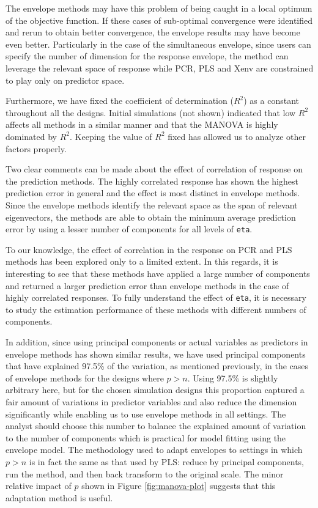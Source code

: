 \documentclass[review]{elsarticle}
\begin{document}
The envelope methods may have this problem of being caught in a local optimum of the objective function. If these cases of sub-optimal convergence were identified and rerun to obtain better convergence, the envelope results may have become even better. Particularly in the case of the simultaneous envelope, since users can specify the number of dimension for the response envelope, the method can leverage the relevant space of response while PCR, PLS and Xenv are constrained to play only on predictor space.

Furthermore, we have fixed the coefficient of determination (\(R^2\)) as a constant throughout all the designs. Initial simulations (not shown) indicated that low \(R^2\) affects all methods in a similar manner and that the MANOVA is highly dominated by \(R^2\). Keeping the value of \(R^2\) fixed has allowed us to analyze other factors properly.

Two clear comments can be made about the effect of correlation of response on the prediction methods. The highly correlated response has shown the highest prediction error in general and the effect is most distinct in envelope methods. Since the envelope methods identify the relevant space as the span of relevant eigenvectors, the methods are able to obtain the minimum average prediction error by using a lesser number of components for all levels of \texttt{eta}.

To our knowledge, the effect of correlation in the response on PCR and PLS methods has been explored only to a limited extent. In this regards, it is interesting to see that these methods have applied a large number of components and returned a larger prediction error than envelope methods in the case of highly correlated responses. To fully understand the effect of \texttt{eta}, it is necessary to study the estimation performance of these methods with different numbers of components.

In addition, since using principal components or actual variables as predictors in envelope methods has shown similar results, we have used principal components that have explained 97.5\% of the variation, as mentioned previously, in the cases of envelope methods for the designs where \(p>n\). Using 97.5\% is slightly arbitrary here, but for the chosen simulation designs this proportion captured a fair amount of variations in predictor variables and also reduce the dimension significantly while enabling us to use envelope methods in all settings. The analyst should choose this number to balance the explained amount of variation to the number of components which is practical for model fitting using the envelope model. The methodology used to adapt envelopes to settings in which \(p>n\) is in fact the same as that used by PLS: reduce by principal components, run the method, and then back transform to the original scale. The minor relative impact of \(p\) shown in Figure \ref{fig:manova-plot} suggests that this adaptation method is useful.
\end{document}
